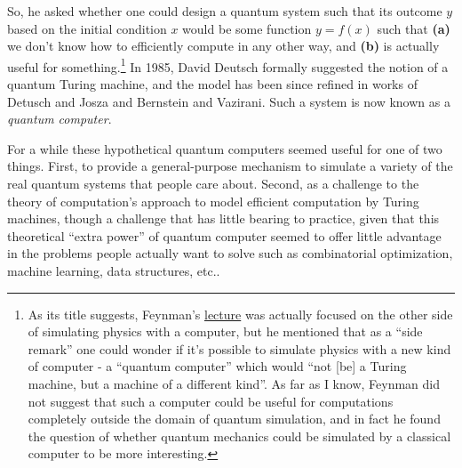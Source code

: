 So, he asked whether one could design a quantum system such that its
outcome \(y\) based on the initial condition \(x\) would be some
function \(y=f(x)\) such that \textbf{(a)} we don't know how to
efficiently compute in any other way, and \textbf{(b)} is actually
useful for something.\footnote{As its title suggests, Feynman's
  \href{https://www.cs.berkeley.edu/~christos/classics/Feynman.pdf}{lecture}
  was actually focused on the other side of simulating physics with a
  computer, but he mentioned that as a ``side remark'' one could wonder
  if it's possible to simulate physics with a new kind of computer - a
  ``quantum computer'' which would ``not {[}be{]} a Turing machine, but
  a machine of a different kind''. As far as I know, Feynman did not
  suggest that such a computer could be useful for computations
  completely outside the domain of quantum simulation, and in fact he
  found the question of whether quantum mechanics could be simulated by
  a classical computer to be more interesting.} In 1985, David Deutsch
formally suggested the notion of a quantum Turing machine, and the model
has been since refined in works of Detusch and Josza and Bernstein and
Vazirani. Such a system is now known as a \emph{quantum computer}.

For a while these hypothetical quantum computers seemed useful for one
of two things. First, to provide a general-purpose mechanism to simulate
a variety of the real quantum systems that people care about. Second, as
a challenge to the theory of computation's approach to model efficient
computation by Turing machines, though a challenge that has little
bearing to practice, given that this theoretical ``extra power'' of
quantum computer seemed to offer little advantage in the problems people
actually want to solve such as combinatorial optimization, machine
learning, data structures, etc..

